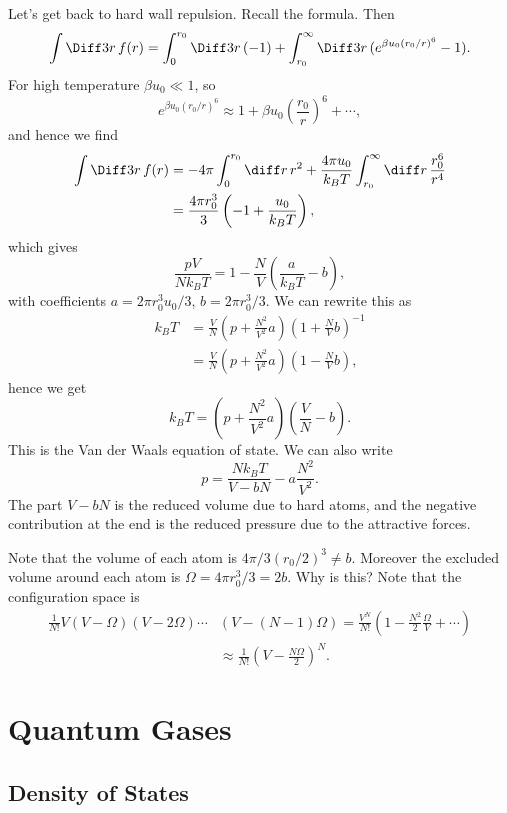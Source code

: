 \documentclass[12pt]{article}
\begin{document}
Let's get back to hard wall repulsion. Recall the formula. Then
\[
\int \Diff3 r \, f(r) = \int_0^{r_0} \Diff3 r \, (-1) + \int_{r_0}^\infty \Diff3 r \, ( e^{\beta u_0(r_0/r)^6} - 1).
\]
For high temperature $\beta u_0 \ll 1$, so
\[
e^{\beta u_0(r_0/r)^6} \approx 1 + \beta u_0 \left( \frac{r_0}{r}\right)^6 + \cdots,
\]
and hence we find
\begin{align*}
	\int \Diff3 r \, f(r) &= - 4\pi \int_0^{r_0}\diff r \, r^2 + \frac{4 \pi u_0}{k_B T} \int_{r_0}^\infty \diff r \, \frac{r_0^6}{r^4} \\
			      &= \frac{4 \pi r_0^3}{3} \left( -1 + \frac{u_0}{k_B T} \right),
\end{align*}
which gives
\[
\frac{p V}{N k_B T} = 1 - \frac{N}{V} \left( \frac{a}{k_B T} - b\right),
\]
with coefficients $a = 2 \pi r_0^3u_0/3$, $b = 2 \pi r_0^3/3$. We can rewrite this as
\begin{align*}
	k_B T &= \frac{V}{N} \left(p + \frac{N^2}{V^2} a \right)\left(1 + \frac{N}{V} b \right)^{-1} \\
	      &= \frac{V}{N} \left(p + \frac{N^2}{V^2} a \right)\left(1 - \frac{N}{V} b \right),
\end{align*}
hence we get
\[
k_B T = \left(p + \frac{N^2}{V^2}a \right)\left( \frac{V}{N} - b \right).
\]
This is the Van der Waals equation of state. We can also write
\[
p = \frac{N k_B T}{V - bN} - a \frac{N^2}{V^2}.
\]
The part $V - bN$ is the reduced volume due to hard atoms, and the negative contribution at the end is the reduced pressure due to the attractive forces.

Note that the volume of each atom is $4 \pi/3 (r_0/2)^3 \neq b$. Moreover the excluded volume around each atom is $\Omega = 4 \pi r_0^3/3 = 2b$. Why is this? Note that the configuration space is
\begin{align*}
	\frac{1}{N!} V (V - \Omega)(V - 2 \Omega) \cdots &(V - (N-1)\Omega) = \frac{V^N}{N!} \left(1 - \frac{N^2}{2} \frac{\Omega}{V} + \cdots\right) \\
&\approx \frac{1}{N!} \left( V - \frac{N \Omega}{2} \right)^N.
\end{align*}

\newpage

\section{Quantum Gases}
\label{sec:q_gas}

\subsection{Density of States}
\label{sub_den_stat}
\end{document}
